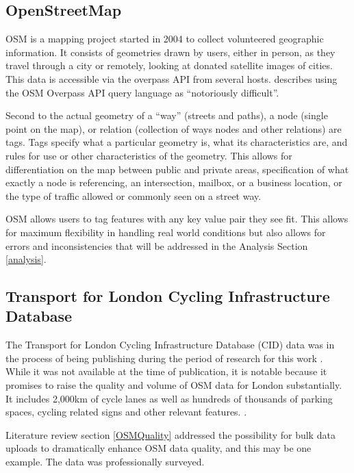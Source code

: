 
\subsection{OpenStreetMap} 


OSM is a mapping project started in 2004 to collect volunteered geographic information. It consists of geometries drawn by users, either in person, as they travel through a city or remotely, looking at donated satellite images of cities. This data is accessible via the overpass API from several hosts. \textcite{osmnx} describes using the OSM Overpass API query language as ``notoriously difficult''.


Second to the actual geometry of a ``way'' (streets and paths), a node (single point on the map), or relation (collection of ways nodes and other relations) are tags. Tags specify what a particular geometry is, what its characteristics are, and rules for use or other characteristics of the geometry. This allows for differentiation on the map between public and private areas, specification of what exactly a node is referencing, an intersection, mailbox, or a business location, or the type of traffic allowed or commonly seen on a street way. 

OSM allows users to tag features with any key value pair they see fit. This allows for maximum flexibility in handling real world conditions but also allows for errors and inconsistencies that will be addressed in the Analysis Section \ref{analysis}.

\subsection{Transport for London Cycling Infrastructure Database}\label{tflcidlit}

The Transport for London Cycling Infrastructure Database (CID) data was in the process of being publishing during the period of research for this work \parencite{tflcid}. While it was not available at the time of publication, it is notable because it promises to raise the quality and volume of OSM data for London substantially. It includes 2,000km of cycle lanes as well as hundreds of thousands of parking spaces, cycling related signs and other relevant features. \parencite{osmtflcidwiki}. 

Literature review section \ref{OSMQuality} addressed the possibility for bulk data uploads to dramatically enhance OSM data quality, and this may be one example. The data was professionally surveyed. 

